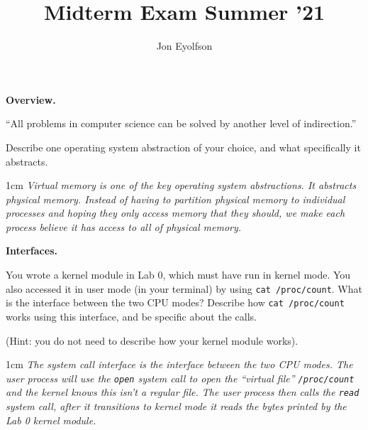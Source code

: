 \documentclass[12pt]{article}
\title{Midterm Exam Summer '21}
\author{Jon Eyolfson}
\newenvironment{answer}{\begin{adjustwidth}{1cm}{}\itshape}{\end{adjustwidth}}
\begin{document}


\newpage


\textbf{Overview.}

\vspace{1em}

``All problems in computer science can be solved by another level of
indirection.''

\vspace{1em}

Describe one operating system abstraction of your choice, and what specifically
it abstracts.

\vspace{1em}

\begin{answer}
  Virtual memory is one of the key operating system abstractions. It abstracts
  physical memory. Instead of having to partition physical memory to individual
  processes and hoping they only access memory that they should, we make each
  process believe it has access to all of physical memory.
\end{answer}

\newpage

\textbf{Interfaces.}

\vspace{1em}

You wrote a kernel module in Lab 0, which must have run in kernel mode. You also
accessed it in user mode (in your terminal) by using \texttt{cat /proc/count}.
What is the interface between the two CPU modes? Describe how
\texttt{cat /proc/count} works using this interface, and be specific about the
calls.

\vspace{1em}

(Hint: you do not need to describe how your kernel module works).

\vspace{1em}

\begin{answer}
  The system call interface is the interface between the two CPU modes.
  The user process will use the \texttt{open} system call to open the ``virtual
  file'' \texttt{/proc/count} and the kernel knows this isn't a regular file.
  The user process then calls the \texttt{read} system call, after it
  transitions to kernel mode it reads the bytes printed by the Lab 0 kernel
  module.
\end{answer}
\end{document}
